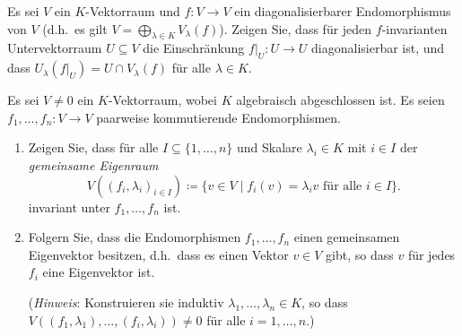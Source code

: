 \begin{question}[subtitle = Einschränkung diagonalisierbarer Endomorphismen]{2}
  Es sei $V$ ein $K$-Vektorraum und $f \colon V \to V$ ein diagonalisierbarer Endomorphismus von $V$ (d.h.\ es gilt \mbox{$V = \bigoplus_{\lambda \in K} V_\lambda(f)$}).
  Zeigen Sie, dass für jeden $f$-invarianten Untervektorraum $U \subseteq V$ die Einschränkung $f|_U \colon U \to U$ diagonalisierbar ist, und dass $U_\lambda(f|_U) = U \cap V_\lambda(f)$ für alle $\lambda \in K$.
\end{question}


\begin{question}[subtitle = Zur Existenz gemeinsamer Eigenvektoren]{3}
  Es sei $V \neq 0$ ein $K$-Vektorraum, wobei $K$ algebraisch abgeschlossen ist.
  Es seien $f_1, \dotsc, f_n \colon V \to V$ paarweise kommutierende Endomorphismen.
  \begin{enumerate}[leftmargin=*]
    \item
      Zeigen Sie, dass für alle $I \subseteq \{1, \dotsc, n\}$ und Skalare $\lambda_i \in K$ mit $i \in I$ der \emph{gemeinsame Eigenraum}
      \[
                   V( (f_i, \lambda_i)_{i \in I} )
        \coloneqq  \{ v \in V \mid \text{$f_i(v) = \lambda_i v$ für alle $i \in I$} \}.
      \]
      invariant unter $f_1, \dotsc, f_n$ ist.
     \item
      Folgern Sie, dass die Endomorphismen $f_1, \dotsc, f_n$ einen gemeinsamen Eigenvektor besitzen, d.h.\ dass es einen Vektor $v \in V$ gibt, so dass $v$ für jedes $f_i$ eine Eigenvektor ist.
      
      (\emph{Hinweis}: Konstruieren sie induktiv $\lambda_1, \dotsc, \lambda_n \in K$, so dass $V((f_1, \lambda_1), \dotsc, (f_i, \lambda_i)) \neq 0$ für alle $i = 1, \dotsc, n$.)
  \end{enumerate}
\end{question}



